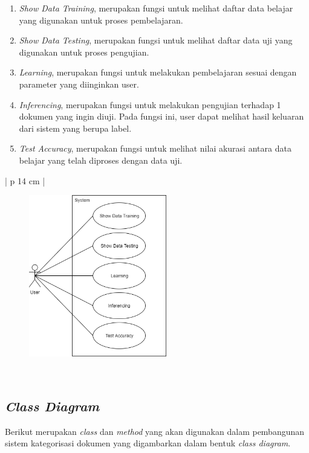 \begin{enumerate}[nolistsep,leftmargin=0.5cm]
\item
{\itshape Show Data Training}, merupakan fungsi untuk melihat daftar data belajar yang digunakan untuk proses pembelajaran.
\item
{\itshape Show Data Testing}, merupakan fungsi untuk melihat daftar data uji yang digunakan untuk proses pengujian.
\item
{\itshape Learning}, merupakan fungsi untuk melakukan pembelajaran sesuai dengan parameter yang diinginkan user.
\item
{\itshape Inferencing}, merupakan fungsi untuk melakukan pengujian terhadap 1 dokumen yang ingin diuji. Pada fungsi ini, user dapat melihat hasil keluaran dari sistem yang berupa label.
\item
{\itshape Test Accuracy}, merupakan fungsi untuk melihat nilai akurasi antara data belajar yang telah diproses dengan data uji.
\end{enumerate}

\begin{table}[H]
\begin{adjustbox}{width=1\textwidth}
\begin{tabular}{| p {14 cm} |}
\hline
\begin{figure}[H]
	\centering
	\includegraphics[width=6cm]{images/UseCase}
\end{figure}\\
\hline
\end{tabular}
\end{adjustbox}
\end{table}

\subsection{{\itshape Class Diagram}}
\indent
Berikut merupakan {\itshape class} dan {\itshape method} yang akan digunakan dalam pembangunan sistem kategorisasi dokumen yang digambarkan dalam bentuk {\itshape class diagram}.

